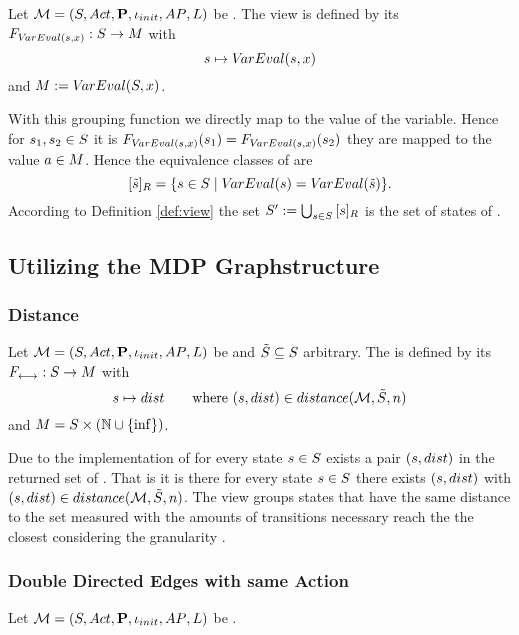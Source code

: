 \documentclass[preview]{standalone}
\begin{document}
\begin{definition}
	Let ${{{\mathcal{M}}}} = {{({S}, {Act}, {\textbf{P}}, {\iota_{init}}, {AP}, {L})}}$ be \achgphN. The view \viewparamvalident is defined by its \grpfctN ${{F_{{V\!arEval}({s},{x})}}} : {S} \to {\ensuremath{{M}}}$ with
	\[
	{s} \mapsto {V\!arEval}({s},{x})
	\]
	and ${{M}} := {V\!arEval}({S}, {x})$.
\end{definition}

With this grouping function we directly map to the value of the variable. Hence for ${s}_1, {s}_2 \in {S}$ it is ${{F_{{V\!arEval}({s},{x})}}}({s}_1) = {{F_{{V\!arEval}({s},{x})}}}({s}_2)$ \iffN they are mapped to the value ${a} \in {\ensuremath{{M}}}$. Hence the equivalence classes of \eqrelview are
\[
{{[{\tilde{{s}}}]_{{R}}}} = \{ {s} \in {S} \mid {V\!arEval}({s}) = {V\!arEval}({\tilde{{s}}})\}.
\]
According to Definition \ref{def:view} the set ${S}' := \bigcup_{{s} \in {S}} {{[{s}]_{{R}}}}$ is the set of states of \viewparamvalident.


\subsection{Utilizing the MDP Graphstructure}
\subsubsection{Distance}
\begin{definition}
		Let ${{{\mathcal{M}}}} = {{({S}, {Act}, {\textbf{P}}, {\iota_{init}}, {AP}, {L})}}$ be \achgphN and ${\tilde{{S}}} \subseteq {S}$ arbitrary.  The \viewN \viewdistance is defined by its \grpfctN ${{F_{{\longleftrightarrow}}}} : {S} \to {\ensuremath{{M}}}$ with 
		\[
		\state \mapsto \distval \quad \quad \text{where } (\state, \distval) \in \fctdistdefault
		\]
		and $M = {S} \times ({\mathbb{N}} \cup \{\inf\})$.
\end{definition}

Due to the implementation of \fctdistdefault for every state ${s} \in {S}$ exists a pair $({s}, {dist})$ in the returned set of \fctdistdefault. That is it is there for every state ${s} \in {S}$ there exists  $({s}, {dist})$ with $ (\state, \distval)\in \fctdistdefault$. The view groups states that have the same distance to the set measured with the amounts of transitions necessary reach the the closest \smstates considering the granularity \granularity.

\subsubsection{Double Directed Edges with same Action}
\begin{definition}
	Let ${{{\mathcal{M}}}} = {{({S}, {Act}, {\textbf{P}}, {\iota_{init}}, {AP}, {L})}}$ be \achgphN.
\end{definition}
\end{document}
